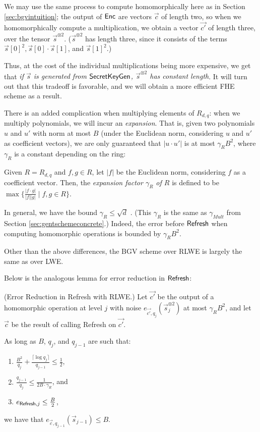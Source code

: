     We may use the same process to compute homomorphically here as in Section \ref{sec:bgvintuition}; the output of ${\sf Enc}$ are vectors $\vec{c}$ of length two, so when we homomorphically compute a multiplication, we obtain a vector $\vec{c'}$ of length three, over the tensor $\vec{s}^{\otimes 2}$. ($\vec{s}^{\otimes 2}$ has length three, since it consists of the terms $\vec{s}[0]^2, \vec{s}[0] \cdot \vec{s}[1]$, and $\vec{s}[1]^2.$)

    Thus, at the cost of the individual multiplications being more expensive, we get that \emph{if $\vec{s}$ is generated from ${\sf SecretKeyGen}$, $\vec{s}^{\otimes 2}$ has constant length}. It will turn out that this tradeoff is favorable, and we will obtain a more efficient FHE scheme as a result.

    There is an added complication when multiplying elements of $R_{d, q}$: when we multiply polynomials, we will incur an \emph{expansion}. That is, given two polynomials $u$ and $u'$ with norm at most $B$ (under the Euclidean norm, considering $u$ and $u'$ as coefficient vectors), we are only guaranteed that $|u \cdot u'|$ is at most $\gamma_R B^2$, where $\gamma_R$ is a constant depending on the ring:
    \begin{definition}
        Given $R = R_{d, q}$ and $f, g \in R$, let $|f|$ be the Euclidean norm, considering $f$ as a coefficient vector. Then, the \emph{expansion factor $\gamma_R$ of $R$} is defined to be $\max\{\frac{|f \cdot g|}{|f| |g|} \mid f, g \in R\}.$
    \end{definition}

    In general, we have the bound $\gamma_R \leq \sqrt{d}$ \cite{bgv2011}. (This $\gamma_R$ is the same as $\gamma_{Mult}$ from Section \ref{sec:gentschemeconcrete}.) Indeed, the error before ${\sf Refresh}$ when computing homomorphic operations is bounded by $\gamma_R B^2$.

    Other than the above differences, the BGV scheme over RLWE is largely the same as over LWE.

    Below is the analogous lemma for error reduction in ${\sf Refresh}$:
    \begin{lemma} (Error Reduction in \textsf{Refresh} with RLWE.)
        Let $\vec{c'}$ be the output of a homomorphic operation at level $j$ with noise $e_{\vec{c'}, q_j}(\vec{s}_j^{\otimes 2})$ at most $\gamma_R B^2$, and let $\vec{c}$ be the result of calling \textsf{Refresh} on $\vec{c'}$.

        As long as $B$, $q_j$, and $q_{j-1}$ are such that:
        \begin{enumerate}
            \item $\frac{B^2}{q_j} + \frac{\lceil \log q_j \rceil}{q_{j-1}} \leq \frac{1}{2}$,
            \item $\frac{q_{j-1}}{q_j} \leq \frac{1}{2B \cdot \gamma_R}$, and
            \item $e_{{\sf Refresh}, j} \leq \frac{B}{2}$,
        \end{enumerate}

        we have that $e_{\vec{c}, q_{j-1}}(\vec{s}_{j-1}) \leq B$.
    \end{lemma}

